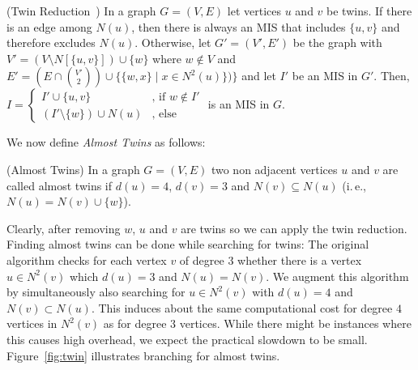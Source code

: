 \documentclass[a4paper,UKenglish,cleveref, autoref, thm-restate]{lipics-v2021}
\newcommand{\ie}{i.\,e.,\xspace}
\begin{document}
\begin{theorem} (Twin Reduction~\cite{XiaoUnconfined}) In a graph $G=(V,E)$ let
  vertices $u$ and $v$ be twins. If there is an edge among $N(u)$, then there is
  always an MIS that includes $\{u,v\}$ and therefore
  excludes $N(u)$. Otherwise, let $G'=(V',E')$ be the graph with $V'=(V\setminus
  N[\{u,v\}])\cup\{w\}$ where $w\notin V$ and $E'=(E\cap\binom{V'}{2})\cup
  \{\{w,x\}\;|\;x\in N^2(u)\})\}$ and let $I'$ be an MIS in $G'$. Then, 
  $
  I=\begin{cases}
    I'\cup \{u,v\} & \text{, if }w\notin I'\\
    (I'\setminus \{w\})\cup N(u) & \text{, else} %
  \end{cases}
  $
  is an MIS in $G$.
\end{theorem}

We now define \emph{Almost Twins} as follows:
\begin{definition} (Almost Twins)
  In a graph $G=(V,E)$ two non adjacent vertices $u$ and $v$ are called almost twins if $d(u) = 4$, $d(v) = 3$ and $N(v)\subseteq N(u)$ (\ie $N(u) = N(v) \cup \{w\}$). 
\end{definition}

Clearly, after removing $w$, $u$ and $v$ are twins so we can apply the twin
reduction. Finding almost twins can be done while searching for twins: The
original algorithm checks for each vertex $v$ of degree $3$ whether there is a
vertex $u \in N^2(v)$ which $d(u) = 3$ and $N(u) = N(v)$. We augment this
algorithm by simultaneously also searching for $u \in N^2(v)$ with $d(u) = 4$
and $N(v) \subset N(u)$. This induces about the same computational cost for
degree $4$ vertices in $N^2(v)$ as for degree $3$ vertices. While there might be
instances where this causes high overhead, we expect the practical slowdown to
be small. Figure~\ref{fig:twin} illustrates branching for almost twins. 
\end{document}
